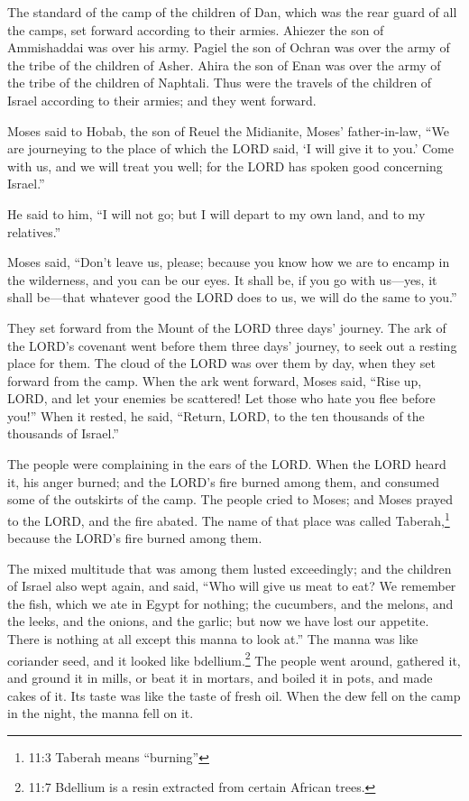 \myverse{}The standard of the camp of the children of Dan, which was the
rear guard of all the camps, set forward according to their armies. Ahiezer the son of Ammishaddai was
over his army.
\myverse{}Pagiel the son of Ochran was over the army of the tribe of the children of
Asher.
\myverse{}Ahira the son of Enan was over the army of the tribe of the children of Naphtali.
\myverse{}Thus were the travels of the children of Israel according to their armies;
and they went forward.


\myverse{}Moses said to Hobab, the son of Reuel the Midianite, Moses’
father-in-law, “We are journeying to the place of which the LORD said, ‘I will give it to you.’ Come with
us, and we will treat you well; for the LORD has spoken good concerning Israel.”


\myverse{}He said to him, “I will not go; but I will depart to my own
land, and to my relatives.”


\myverse{}Moses said, “Don’t leave us, please; because you know how we
are to encamp in the wilderness, and you can be our eyes.
\myverse{}It shall be, if you go with us—yes, it shall be—that whatever good the LORD
does to us, we will do the same to you.”


\myverse{}They set forward from the Mount of the LORD three days’ journey.
The ark of the LORD’s covenant went before them three days’ journey, to seek out a resting place for them.
\myverse{}The cloud of the LORD was over them by day, when they set forward from the
camp.
\myverse{}When the ark went forward, Moses said, “Rise up, LORD, and let your enemies
be scattered! Let those who hate you flee before you!”
\myverse{}When it rested, he said, “Return, LORD, to the ten thousands of the thousands
of Israel.”


\mychapter{} \myverse*{}The people were complaining in the ears of the LORD. When the
LORD heard it, his anger burned; and the LORD’s fire burned among them, and consumed some of the outskirts
of the camp.
\myverse{}The people cried to Moses; and Moses prayed to the LORD, and the fire abated.
\myverse{}The name of that place was called Taberah,\footnote{ 11:3 Taberah means “burning”
} because the LORD’s fire burned among them.


\myverse{}The mixed multitude that was among them lusted exceedingly; and
the children of Israel also wept again, and said, “Who will give us meat to eat?
\myverse{}We remember the fish, which we ate in Egypt for nothing; the cucumbers, and
the melons, and the leeks, and the onions, and the garlic;
\myverse{}but now we have lost our appetite. There is nothing at all except this manna
to look at.”
\myverse{}The manna was like coriander seed, and it looked like bdellium.\footnote{ 11:7 Bdellium is a resin extracted from certain African trees.}
\myverse{}The people went around, gathered it, and ground it in mills, or beat it in
mortars, and boiled it in pots, and made cakes of it. Its taste was like the taste of fresh oil.
\myverse{}When the dew fell on the camp in the night, the manna fell on it.


